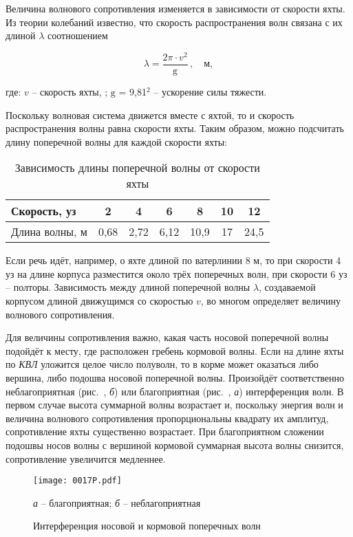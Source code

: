 Величина волнового сопротивления изменяется в зависимости от скорости
яхты. Из теории колебаний известно, что скорость распространения волн
связана с их длиной $\lambda$ соотношением

\begin{equation}
  \lambda = \frac{2 \pi \cdot v^2}{\mathrm g}\,, \quad \text{м},
\end{equation}

где: $v$ \--- скорость яхты, \speedms; $\mathrm g$ = 9,81\speedms$^2$ \--- ускорение силы тяжести. 

Поскольку волновая система движется вместе с яхтой, то и скорость
распространения волны равна скорости яхты. Таким образом, можно
подсчитать длину поперечной волны для каждой скорости яхты:

\begin{table*}[htb]
  \small
  \centering
  \begin{tabular}{l|c|c|c|c|c|c}
    \toprule
    Скорость, уз & 2 & 4 & 6 & 8 & 10 & 12 \\
    \midrule
    Длина волны, м & 0,68 & 2,72 & 6,12 & 10,9 & 17 & 24,5 \\
    \bottomrule
  \end{tabular}
  \caption{Зависимость длины поперечной волны от скорости яхты}
  \label{tab:1-2}
\end{table*}

Если речь идёт, например, о яхте длиной по ватерлинии 8 м, то при
скорости 4 уз на длине корпуса разместится около трёх поперечных волн,
при скорости 6 уз \--- полторы. Зависимость между длиной поперечной
волны $\lambda$, создаваемой корпусом длиной \lkvl движущимся со
скоростью $v$, во многом определяет величину волнового сопротивления.

Для величины сопротивления важно, какая часть носовой поперечной волны
подойдёт к месту, где расположен гребень кормовой волны. Если на длине
яхты по \textit{КВЛ} уложится целое число полуволн, то в корме может
оказаться либо вершина, либо подошва носовой поперечной
волны. Произойдёт соответственно неблагоприятная (рис.~,
\textit{б}) или благоприятная (рис.~, \textit{а})
интерференция волн. В первом случае высота суммарной волны возрастает
и, поскольку энергия волн и величина волнового сопротивления
пропорциональны квадрату их амплитуд, сопротивление яхты существенно
возрастает. При благоприятном сложении подошвы носов волны с вершиной
кормовой суммарная высота волны снизится, сопротивление увеличится
медленнее.

\begin{figure*}[htb]
  \centering
  \texttt{[image: 0017P.pdf]}
  \caption{Интерференция носовой и кормовой поперечных волн}
  \label{fig:17}
  \centering
  \small
  \textit{а} \--- благоприятная;
  \textit{б} \--- неблагоприятная
\end{figure*}

